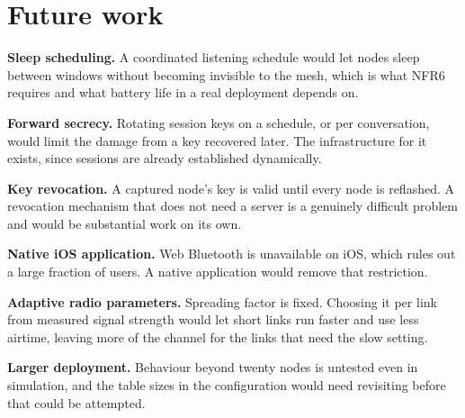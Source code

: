 \documentclass[12pt,a4paper,oneside]{report}
\begin{document}
\section{Future work}

\textbf{Sleep scheduling.} A coordinated listening schedule would let nodes sleep
between windows without becoming invisible to the mesh, which is what NFR6
requires and what battery life in a real deployment depends on.

\textbf{Forward secrecy.} Rotating session keys on a schedule, or per
conversation, would limit the damage from a key recovered later. The
infrastructure for it exists, since sessions are already established
dynamically.

\textbf{Key revocation.} A captured node's key is valid until every node is
reflashed. A revocation mechanism that does not need a server is a genuinely
difficult problem and would be substantial work on its own.

\textbf{Native iOS application.} Web Bluetooth is unavailable on iOS, which rules
out a large fraction of users. A native application would remove that
restriction.

\textbf{Adaptive radio parameters.} Spreading factor is fixed. Choosing it per
link from measured signal strength would let short links run faster and use less
airtime, leaving more of the channel for the links that need the slow setting.

\textbf{Larger deployment.} Behaviour beyond twenty nodes is untested even in
simulation, and the table sizes in the configuration would need revisiting before
that could be attempted.



\end{document}
